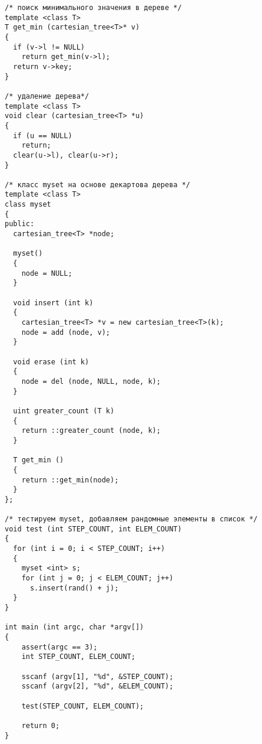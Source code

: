 \begin{lstlisting}
/* поиск минимального значения в дереве */
template <class T>
T get_min (cartesian_tree<T>* v)
{
  if (v->l != NULL)
    return get_min(v->l);
  return v->key;
}

/* удаление дерева*/
template <class T>
void clear (cartesian_tree<T> *u)
{
  if (u == NULL)
    return;
  clear(u->l), clear(u->r);
}

/* класс myset на основе декартова дерева */
template <class T>
class myset
{
public:
  cartesian_tree<T> *node;

  myset()
  {
    node = NULL;
  }

  void insert (int k)
  {
    cartesian_tree<T> *v = new cartesian_tree<T>(k);
    node = add (node, v);
  }

  void erase (int k)
  {
    node = del (node, NULL, node, k);
  }

  uint greater_count (T k)
  {
    return ::greater_count (node, k);
  }

  T get_min ()
  {
    return ::get_min(node);
  }
};

/* тестируем myset, добавляем рандомные элементы в список */
void test (int STEP_COUNT, int ELEM_COUNT)
{
  for (int i = 0; i < STEP_COUNT; i++)
  {
    myset <int> s;
    for (int j = 0; j < ELEM_COUNT; j++)   
      s.insert(rand() + j);
  }
} 

int main (int argc, char *argv[])
{
	assert(argc == 3);
	int STEP_COUNT, ELEM_COUNT;

	sscanf (argv[1], "%d", &STEP_COUNT);
	sscanf (argv[2], "%d", &ELEM_COUNT);

	test(STEP_COUNT, ELEM_COUNT);

	return 0;
}
\end{lstlisting}

